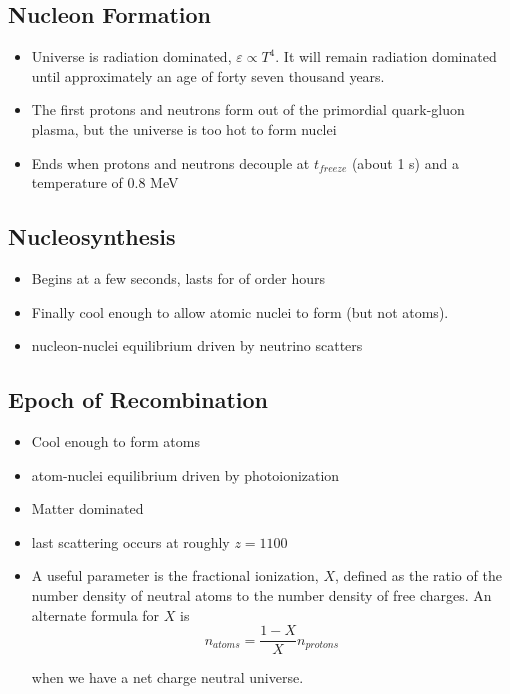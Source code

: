 \documentclass[12pt]{article}
\begin{document}
\subsection{Nucleon Formation}

\begin{itemize}
\item Universe is radiation dominated, \(\varepsilon \propto T^4\). It will remain radiation dominated until approximately an age of forty seven thousand years.

\item The first protons and neutrons form out of the primordial quark-gluon plasma, but the universe is too hot to form nuclei

\item Ends when protons and neutrons decouple at \(t_{freeze}\) (about 1 s) and a temperature of 0.8 MeV


\end{itemize}

\subsection{Nucleosynthesis}

\begin{itemize}
\item Begins at a few seconds, lasts for of order hours
\item  Finally cool enough to allow atomic nuclei to form (but not atoms). 
\item nucleon-nuclei equilibrium driven by neutrino scatters
\end{itemize}

\subsection{Epoch of Recombination}

\begin{itemize}
\item Cool enough to form atoms
\item atom-nuclei equilibrium driven by photoionization
\item Matter dominated
\item last scattering occurs at roughly \(z = 1100\)
\item A useful parameter is the fractional ionization, \(X\), defined as the ratio of the number density of neutral atoms to the number density of free charges. An alternate formula for \(X\) is
\[ n_{atoms} = \frac{1-X}{X}n_{protons}
\]

when we have a net charge neutral universe.
\end{itemize}
\end{document}
